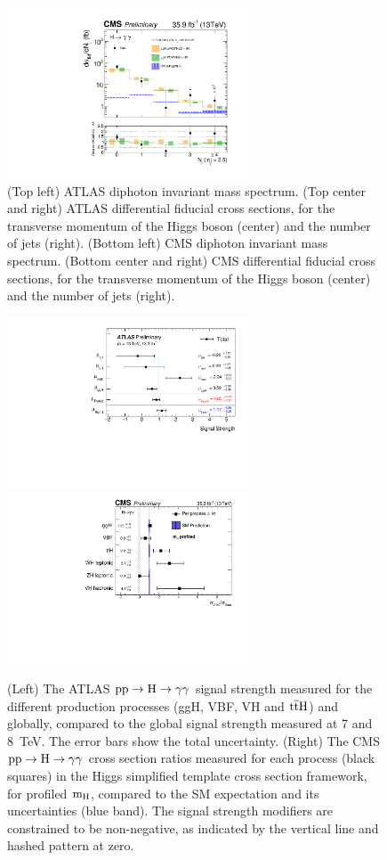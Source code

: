 \documentclass[10pt]{article}
\begin{document}
\begin{figure}[htb]
\includegraphics[height=2in]{figures/CMS-HIG-17-015__Figure_004-b__njets.pdf}
\caption{
  (Top left) ATLAS diphoton invariant mass spectrum.
  (Top center and right) ATLAS differential fiducial cross sections, for the
  transverse momentum of the Higgs boson (center) and the number of jets (right).
  (Bottom left) CMS diphoton invariant mass spectrum.
  (Bottom center and right) CMS differential fiducial cross sections, for the
  transverse momentum of the Higgs boson (center) and the number of jets (right).
}
\label{fig:figure-gg}
\end{figure}


\begin{figure}[htb]
\centering
\includegraphics[height=2in]{figures/ATLAS-CONF-2016-067__fig_14__mu.pdf}
\includegraphics[height=2in]{figures/CMS-HIG-16-040__Figure_017__mu.pdf}
\caption{
  (Left) The ATLAS ${\rm pp\to H\to \gamma\gamma}$ signal strength measured for
  the different production processes (ggH, VBF, VH and ${\rm t{\bar t}H}$) and
  globally, compared to the global signal strength measured at 7 and 8~TeV. The
  error bars show the total uncertainty.
  (Right) The CMS ${\rm pp\to H\to \gamma\gamma}$ cross section ratios measured
  for each process (black squares) in the Higgs simplified template cross section
  framework, for profiled ${\rm m_H}$, compared to the SM expectation and its
  uncertainties (blue band). The signal strength modifiers are constrained to be
  non-negative, as indicated by the vertical line and hashed pattern at zero.
}
\label{fig:figure-gg-2}
\end{figure}
\end{document}
